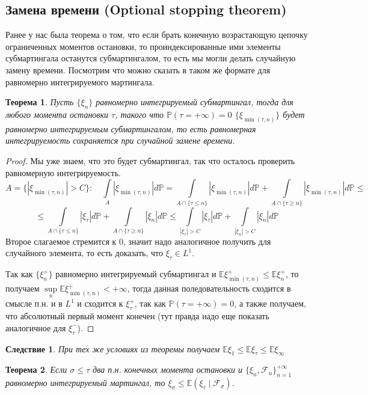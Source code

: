 \documentclass[12pt,a4paper]{article} %
\newtheorem{theorem}{Теорема}
\newtheorem{consequence}{Следствие}
\newcommand{\E}{\mathbb{E}}
\newcommand{\PR}{\mathbb{P}}
\newcommand{\F}{\mathcal{F}}
\begin{document}
	\subsection{Замена времени (Optional stopping theorem)}
	Ранее у нас была теорема о том, что если брать конечную возрастающую цепочку ограниченных моментов остановки, то проиндексированные ими элементы субмартингала останутся субмартингалом, то есть мы могли делать случайную замену времени. Посмотрим что можно сказать в таком же формате для равномерно интегрируемого мартингала.
	\begin{theorem}
		Пусть $\{\xi_n\}$ равномерно интегрируемый субмартингал, тогда для любого момента остановки $\tau$, такого что $\PR(\tau=+\infty)=0$ $\{\xi_{\min(\tau,n)}\}$ будет равномерно интегрируемым субмартингалом, то есть равномерная интегрируемость сохраняется при случайной замене времени.
	\end{theorem}
	\begin{proof}
		Мы уже знаем, что это будет субмартингал, так что осталось проверить равномерную интегрируемость.
		$$A=\{|\xi_{\min(\tau,n)}|>C\}:\quad\int\limits_A|\xi_{\min(\tau,n)}|d\PR=\int\limits_{A\cap\{\tau\leq n\}}|\xi_{\min(\tau,n)}|d\PR+\int\limits_{A\cap\{\tau\geq n\}}|\xi_{\min(\tau,n)}|d\PR\leq$$
		$$\leq\int\limits_{A\cap\{\tau\leq n\}}|\xi_{\tau}|d\PR+\int\limits_{A\cap\{\tau\geq n\}}|\xi_n|d\PR\leq\int\limits_{|\xi_{\tau}|>C}|\xi_{\tau}|d\PR+\int\limits_{|\xi_n|>C}|\xi_n|d\PR$$
		Второе слагаемое стремится к 0, значит надо аналогичное получить для случайного элемента, то есть доказать, что $\xi_{\tau}\in L^1$.
		
		Так как $\{\xi_n^{+}\}$ равномерно интегрируемый субмартингал и $\E\xi_{\min(\tau,n)}^{+}\leq\E\xi_n^{+}$, то получаем $\sup\limits_n\E\xi_{\min(\tau,n)}^{+}<+\infty$, тогда данная поледовательность сходится в смысле п.н. и в $L^1$ и сходится к $\xi_{\tau}^{+}$, так как $\PR(\tau=+\infty)=0$, а также получаем, что абсолютный первый момент конечен (тут правда надо еще показать аналогичное для $\xi_{\tau}^{-}$).
	\end{proof}
	\begin{consequence}
		При тех же условиях из теоремы получаем $\E\xi_1\leq\E\xi_{\tau}\leq\E\xi_{\infty}$
	\end{consequence}
	\begin{theorem}
		Если $\sigma\leq\tau$ два п.н. конечных момента остановки и $\{\xi_n,\F_n\}_{n=1}^{+\infty}$ равномерно интегрируемый мартингал, то $\xi_{\sigma}\leq\E(\xi_{\tau}\mid\F_{\sigma})$.
	\end{theorem}
\end{document}
